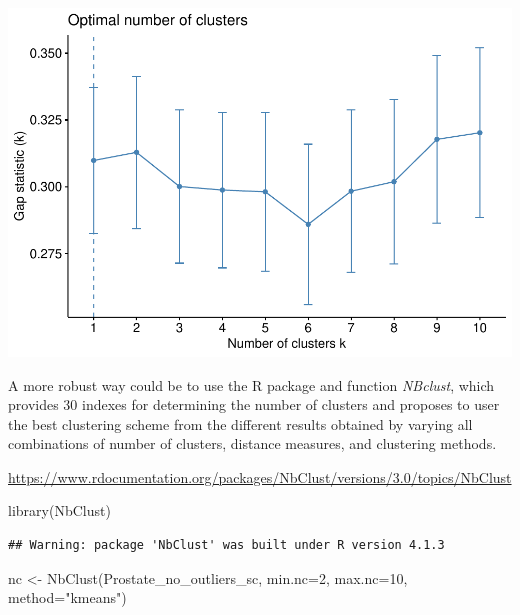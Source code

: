 \documentclass[
]{article}
\newenvironment{Shaded}{\begin{snugshade}}{\end{snugshade}}
\newcommand{\AttributeTok}[1]{\textcolor[rgb]{0.77,0.63,0.00}{#1}}
\newcommand{\DecValTok}[1]{\textcolor[rgb]{0.00,0.00,0.81}{#1}}
\newcommand{\FunctionTok}[1]{\textcolor[rgb]{0.00,0.00,0.00}{#1}}
\newcommand{\NormalTok}[1]{#1}
\newcommand{\OtherTok}[1]{\textcolor[rgb]{0.56,0.35,0.01}{#1}}
\newcommand{\StringTok}[1]{\textcolor[rgb]{0.31,0.60,0.02}{#1}}
\begin{document}
\includegraphics{clustering_files/figure-latex/unnamed-chunk-60-1.pdf}

A more robust way could be to use the R package and function
\emph{NBclust}, which provides 30 indexes for determining the number of
clusters and proposes to user the best clustering scheme from the
different results obtained by varying all combinations of number of
clusters, distance measures, and clustering methods.

\url{https://www.rdocumentation.org/packages/NbClust/versions/3.0/topics/NbClust}

\begin{Shaded}
\begin{Highlighting}[]
\FunctionTok{library}\NormalTok{(NbClust)}
\end{Highlighting}
\end{Shaded}

\begin{verbatim}
## Warning: package 'NbClust' was built under R version 4.1.3
\end{verbatim}

\begin{Shaded}
\begin{Highlighting}[]
\NormalTok{nc }\OtherTok{\textless{}{-}} \FunctionTok{NbClust}\NormalTok{(Prostate\_no\_outliers\_sc, }\AttributeTok{min.nc=}\DecValTok{2}\NormalTok{, }\AttributeTok{max.nc=}\DecValTok{10}\NormalTok{, }\AttributeTok{method=}\StringTok{"kmeans"}\NormalTok{)}
\end{Highlighting}
\end{Shaded}
\end{document}
